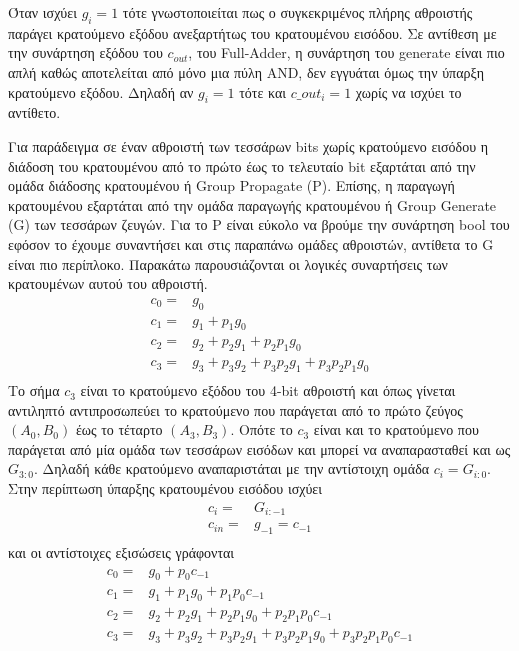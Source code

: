 Όταν ισχύει $g_i=1$ τότε γνωστοποιείται πως ο συγκεκριμένος πλήρης αθροιστής παράγει κρατούμενο εξόδου ανεξαρτήτως του κρατουμένου εισόδου. Σε αντίθεση με την συνάρτηση εξόδου του $c_{out}$, του Full-Adder, η συνάρτηση του generate είναι πιο απλή καθώς αποτελείται από μόνο μια πύλη AND, δεν εγγυάται όμως την ύπαρξη κρατούμενο εξόδου. Δηλαδή αν $g_i=1$ τότε και $c\_out_i=1$ χωρίς να ισχύει το αντίθετο. 

Για παράδειγμα σε έναν αθροιστή των τεσσάρων bits χωρίς κρατούμενο εισόδου η διάδοση του κρατουμένου από το πρώτο έως το τελευταίο bit εξαρτάται από την ομάδα διάδοσης κρατουμένου ή Group Propagate (P). Επίσης, η παραγωγή κρατουμένου εξαρτάται από την ομάδα παραγωγής κρατουμένου ή Group Generate (G) των τεσσάρων ζευγών. Για το P είναι εύκολο να βρούμε την συνάρτηση bool του εφόσον το έχουμε συναντήσει και στις παραπάνω ομάδες αθροιστών, αντίθετα το G είναι πιο περίπλοκο. Παρακάτω παρουσιάζονται οι λογικές συναρτήσεις των κρατουμένων αυτού του αθροιστή.
\begin{equation}
    \begin{split}
        c_0 =& g_0 \\
        c_1 =& g_1 + p_1g_0 \\
        c_2 =& g_2 + p_2g_1 + p_2p_1g_0 \\
        c_3 =& g_3 + p_3g_2 + p_3p_2g_1 + p_3p_2p_1g_0 \\
    \end{split}
    \label{eq:cla_carries_4bit}
\end{equation}
Το σήμα $c_3$ είναι το κρατούμενο εξόδου του 4-bit αθροιστή και όπως γίνεται αντιληπτό αντιπροσωπεύει το κρατούμενο που παράγεται από το πρώτο ζεύγος $(Α_0,Β_0)$ έως το τέταρτο $(A_3,B_3)$. Οπότε το $c_3$ είναι και το κρατούμενο που παράγεται από μία ομάδα των τεσσάρων εισόδων και μπορεί να αναπαρασταθεί και ως $G_{3:0}$. Δηλαδή κάθε κρατούμενο αναπαριστάται με την αντίστοιχη ομάδα $c_i = G_{i:0}$. Στην περίπτωση ύπαρξης κρατουμένου εισόδου ισχύει
\begin{equation}
    \begin{split}
        c_i =& G_{i:-1}\\
        c_{in} =& g_{-1} = c_{-1}\\
    \end{split}
\end{equation}
και οι αντίστοιχες εξισώσεις γράφονται
\begin{equation*}
    \begin{split}
        c_0 =& g_0 + p_0c_{-1} \\
        c_1 =& g_1 + p_1g_0 + p_1p_0c_{-1} \\
        c_2 =& g_2 + p_2g_1 + p_2p_1g_0 + p_2p_1p_0c_{-1} \\
        c_3 =& g_3 + p_3g_2 + p_3p_2g_1 + p_3p_2p_1g_0 + p_3p_2p_1p_0c_{-1} \\
    \end{split}
\end{equation*}

